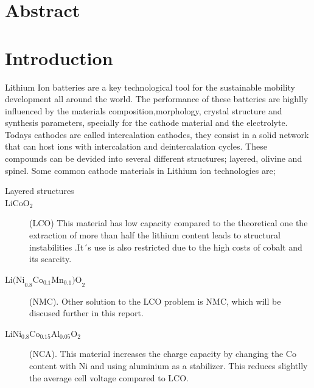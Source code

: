 \documentclass{article}
\begin{document}
\date{
  \vspace{2cm}
  \small{January 24, 2024}
}




\maketitle
\newpage
\setcounter{page}{1}  %
\tableofcontents
\newpage
\section{Abstract}
\section {Introduction}

Lithium Ion batteries are a key technological tool for the sustainable mobility development all around the world. The performance of these batteries are highlly influenced by the materials composition,morphology, crystal structure and synthesis parameters, specially for the cathode material and the electrolyte.\\
Todays cathodes are called intercalation cathodes, they consist in a solid network that can host ions with intercalation and deintercalation cycles.
These compounds can be devided into several different structures; layered, olivine and spinel.
Some common cathode materials in Lithium ion technologies are;\\
\begin{description}
  \item[Layered structures]
  \item[$\text{LiCoO}_{2}$]  (LCO) This material has low capacity compared to the 
  theoretical one the extraction of more than half the lithium content leads to structural instabilities
  .It´s use is also restricted due to the high costs of cobalt and its scarcity. 
  \item[$ \text{Li(Ni}_{0.8}\text{Co}_{0.1}\text{Mn}_{0.1}\text{)O}_{2} $]  (NMC). 
  Other solution to the LCO problem is NMC, which will be discused
  further in this report.

  \item[$\text{LiNi}_{0.8}\text{Co}_{0.15}\text{Al}_{0.05}\text{O}_{2}$] (NCA).
  This material increases the charge capacity by changing the Co content with Ni and using aluminium as 
  a stabilizer. This reduces slightlly the average cell voltage
  compared to LCO.
  \\
\end{description}
\end{document}
